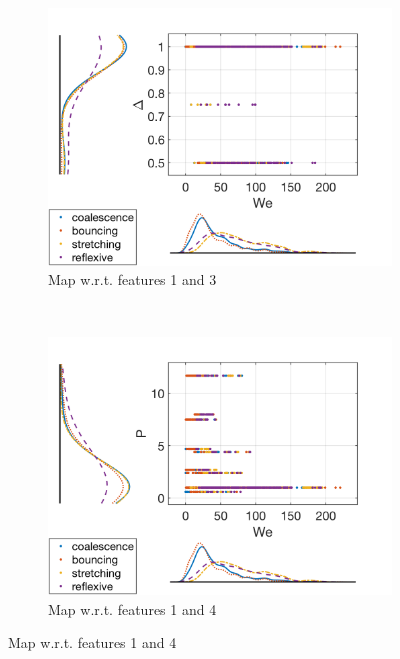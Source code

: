 \documentclass{article}
\begin{document}
\begin{figure}[h!]
    \centering
    \begin{subfigure}[b]{0.4\textwidth}
        \includegraphics[width=\textwidth]{../figures/data_scatterhist1.png}
        \caption{Map w.r.t. features 1 and 3 }
        \label{fig:data1}
    \end{subfigure}
    ~ %
    \begin{subfigure}[b]{0.4\textwidth}
        \includegraphics[width=\textwidth]{../figures/data_scatterhist2.png}
        \caption{Map w.r.t. features 1 and 4 }
        \label{fig:data2}
    \end{subfigure}

\end{figure}
\end{document}
